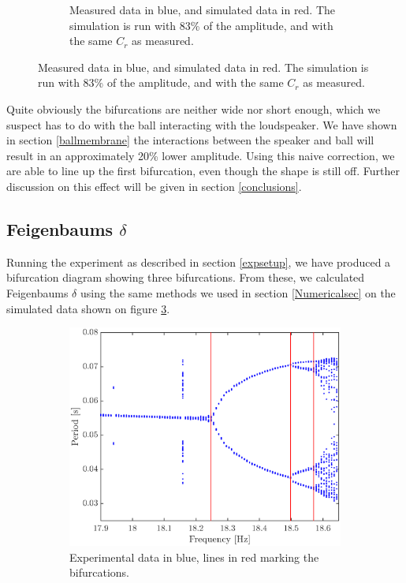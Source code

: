 \documentclass[12pt,oneside,a4paper]{article}
\numberwithin{equation}{section}
\begin{document}
{{{{\begin{figure}
\begin{subfigure}[t]{0.49\textwidth}
	\caption{Measured data in blue, and simulated data in red. The simulation is run with 83\% of the amplitude, and with the same $C_r$ as measured.}
	\label{fakedata}
\end{subfigure}
\end{figure}
Quite obviously the bifurcations are neither wide nor short enough, which we 
suspect has to do with the ball interacting with the loudspeaker. We have shown in section \ref{ballmembrane} the interactions between the speaker and ball will result in an approximately 20\% lower amplitude. Using this naive correction, we are able to line up the first bifurcation, even though the shape is still off. Further discussion on this effect will be given in section \ref{conclusions}.
\subsection{Feigenbaums $\delta$}
Running the experiment as described in section \ref{expsetup}, we have produced a bifurcation diagram showing three bifurcations. From these, we calculated Feigenbaums $\delta$ using the same methods we used in section \ref{Numericalsec} on the simulated data shown on figure \ref{expfeigplot}.
\begin{figure}[h]
\centering
\begin{subfigure}[t]{0.49\textwidth}
\centering
\includegraphics[width=\textwidth]{feigplotexp}
\caption{Experimental data in blue, lines in red marking the bifurcations.}
\label{expfeigplot}
\end{subfigure} \hfill
\begin{subfigure}[t]{0.49\textwidth}

\end{subfigure}
\end{figure}}}}}
\end{document}
